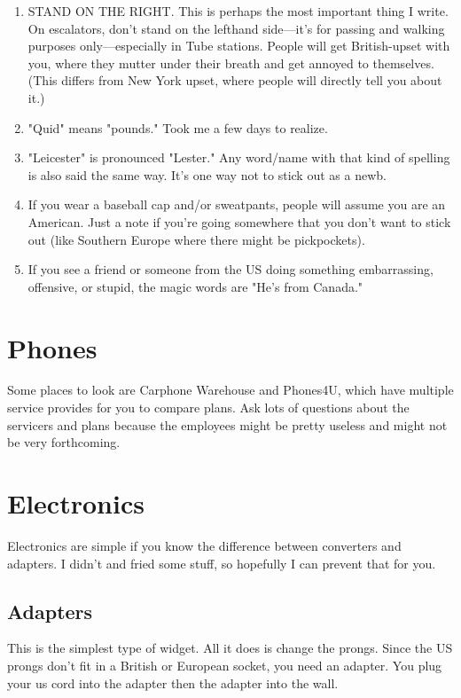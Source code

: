 \documentclass[a4paper,12pt]{scrartcl}
\begin{document}
\begin{enumerate}
   \item STAND ON THE RIGHT. This is perhaps the most important thing
       I write. On escalators, don't stand on the lefthand side---it's
       for passing and walking purposes only---especially in Tube 
       stations. People will get British-upset 
       with you, where they mutter under their breath and 
       get annoyed to themselves. 
       (This differs from New York upset, where people will
       directly tell you about it.)
   \item  "Quid" means "pounds." Took me a few days to realize.
   \item "Leicester" is pronounced "Lester." Any word/name
      with that kind of spelling is also said the same way. It's
      one way not to stick out as a newb. 
   \item If you wear a baseball cap and/or sweatpants, people will 
      assume you are an American. Just a note if you're going somewhere 
      that you don't want to stick out (like 
      Southern Europe where there might be pickpockets).
   \item If you see a friend or someone from the US doing 
      something embarrassing, offensive, or stupid,
      the magic words are "He's from Canada."
\end{enumerate}



\section{Phones}

Some places to look are Carphone Warehouse and Phones4U, which
have multiple service provides for you to compare plans.
Ask lots of questions about the servicers and plans because
the employees might be pretty useless and might not be
very forthcoming.



\section{Electronics}

Electronics are simple if you know the difference between converters
and adapters. I didn't and fried some stuff, so hopefully I can 
prevent that for you. 

\subsection{Adapters} 
This is the simplest type of widget. All it does is change the prongs.
Since the US prongs don't fit in a British or European socket, 
you need an adapter. You plug your us cord into the adapter
then the adapter into the wall. 
\end{document}
